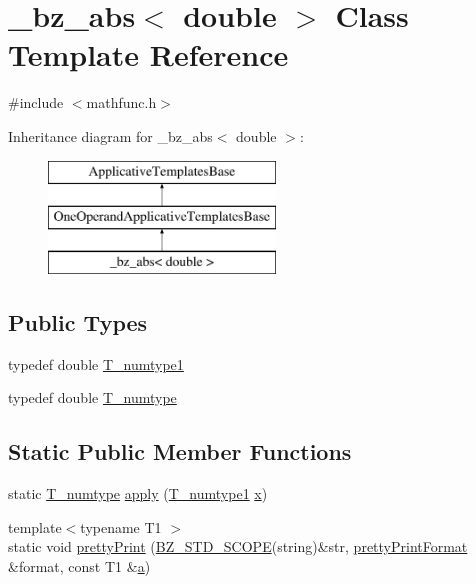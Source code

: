 \hypertarget{class__bz__abs_3_01double_01_4}{}\section{\+\_\+bz\+\_\+abs$<$ double $>$ Class Template Reference}
\label{class__bz__abs_3_01double_01_4}


{\ttfamily \#include $<$mathfunc.\+h$>$}

Inheritance diagram for \+\_\+bz\+\_\+abs$<$ double $>$\+:\begin{figure}[H]
\begin{center}
\leavevmode
\includegraphics[height=3.000000cm]{class__bz__abs_3_01double_01_4}
\end{center}
\end{figure}
\subsection*{Public Types}
\begin{DoxyCompactItemize}
\item 
typedef double \hyperlink{class__bz__abs_3_01double_01_4_a86363005f7eb7ae5274a074f7d59567a}{T\+\_\+numtype1}
\item 
typedef double \hyperlink{class__bz__abs_3_01double_01_4_a82f5a5f531e001daebab12fe4e0aa941}{T\+\_\+numtype}
\end{DoxyCompactItemize}
\subsection*{Static Public Member Functions}
\begin{DoxyCompactItemize}
\item 
static \hyperlink{class__bz__abs_3_01double_01_4_a82f5a5f531e001daebab12fe4e0aa941}{T\+\_\+numtype} \hyperlink{class__bz__abs_3_01double_01_4_ac22b1e9f5cb42926cea000d486806242}{apply} (\hyperlink{class__bz__abs_3_01double_01_4_a86363005f7eb7ae5274a074f7d59567a}{T\+\_\+numtype1} \hyperlink{vecnorm1_8cc_ac73eed9e41ec09d58f112f06c2d6cb63}{x})
\item 
{\footnotesize template$<$typename T1 $>$ }\\static void \hyperlink{class__bz__abs_3_01double_01_4_ad41e39ed8712389e4c83a3c794430937}{pretty\+Print} (\hyperlink{numinquire_8h_a2b24ffc3b4ef9803956bc7715c6c7b83}{B\+Z\+\_\+\+S\+T\+D\+\_\+\+S\+C\+O\+P\+E}(string)\&str, \hyperlink{classprettyPrintFormat}{pretty\+Print\+Format} \&format, const T1 \&\hyperlink{gen__mat5files_8m_aae328bf20413f220e38aec4d95bfd6da}{a})
\end{DoxyCompactItemize}


